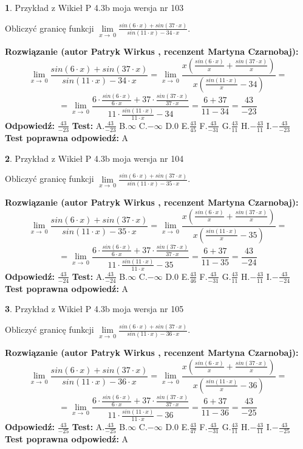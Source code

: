 \documentclass[12pt, a4paper]{article}
\theoremstyle{definition} %
\newtheorem{zad}{}
\newcommand{\zadStart}[1]{\begin{zad}#1\newline}
\newcommand{\zadStop}{\end{zad}}
\newcommand{\rozwStart}[2]{\noindent \textbf{Rozwiązanie (autor #1 , recenzent #2): }\newline}
\newcommand{\rozwStop}{\newline}
\newcommand{\odpStart}{\noindent \textbf{Odpowiedź:}\newline}
\newcommand{\odpStop}{\newline}
\newcommand{\testStart}{\noindent \textbf{Test:}\newline}
\newcommand{\testStop}{\newline}
\newcommand{\kluczStart}{\noindent \textbf{Test poprawna odpowiedź:}\newline}
\newcommand{\kluczStop}{\newline}
\begin{document}
\zadStart{Przykład z Wikieł P 4.3b moja wersja nr 103}


Obliczyć granicę funkcji $\lim\limits_{x\to\ 0}\frac{sin(6 \cdot x)+sin(37 \cdot x)}{sin(11 \cdot x)-34 \cdot x}$.
\zadStop
\rozwStart{Patryk Wirkus}{Martyna Czarnobaj}
$$\lim\limits_{x\to\ 0}\frac{sin(6 \cdot x)+sin(37 \cdot x)}{sin(11 \cdot x)-34 \cdot x}=\lim\limits_{x\to\ 0}\frac{x(\frac{sin(6 \cdot x)}{x}+\frac{sin(37 \cdot x)}{x})}{x(\frac{sin(11 \cdot x)}{x}-34)}=$$
$$=\lim\limits_{x\to\ 0}\frac{6 \cdot \frac{sin(6 \cdot x)}{6 \cdot x}+37 \cdot \frac{sin(37 \cdot x)}{37 \cdot x}}{11 \cdot \frac{sin(11 \cdot x)}{11 \cdot x}-34}=\frac{6+37}{11-34} = \frac{43}{-23}$$
\rozwStop
\odpStart
$\frac{43}{-23}$
\odpStop
\testStart
A.$\frac{43}{-23}$
B.$\infty$
C.$-\infty$
D.$0$
E.$\frac{43}{45}$
F.$\frac{43}{-31}$
G.$\frac{43}{11}$
H.$-\frac{43}{11}$
I.$-\frac{43}{-23}$
\testStop
\kluczStart
A
\kluczStop



\zadStart{Przykład z Wikieł P 4.3b moja wersja nr 104}


Obliczyć granicę funkcji $\lim\limits_{x\to\ 0}\frac{sin(6 \cdot x)+sin(37 \cdot x)}{sin(11 \cdot x)-35 \cdot x}$.
\zadStop
\rozwStart{Patryk Wirkus}{Martyna Czarnobaj}
$$\lim\limits_{x\to\ 0}\frac{sin(6 \cdot x)+sin(37 \cdot x)}{sin(11 \cdot x)-35 \cdot x}=\lim\limits_{x\to\ 0}\frac{x(\frac{sin(6 \cdot x)}{x}+\frac{sin(37 \cdot x)}{x})}{x(\frac{sin(11 \cdot x)}{x}-35)}=$$
$$=\lim\limits_{x\to\ 0}\frac{6 \cdot \frac{sin(6 \cdot x)}{6 \cdot x}+37 \cdot \frac{sin(37 \cdot x)}{37 \cdot x}}{11 \cdot \frac{sin(11 \cdot x)}{11 \cdot x}-35}=\frac{6+37}{11-35} = \frac{43}{-24}$$
\rozwStop
\odpStart
$\frac{43}{-24}$
\odpStop
\testStart
A.$\frac{43}{-24}$
B.$\infty$
C.$-\infty$
D.$0$
E.$\frac{43}{46}$
F.$\frac{43}{-31}$
G.$\frac{43}{11}$
H.$-\frac{43}{11}$
I.$-\frac{43}{-24}$
\testStop
\kluczStart
A
\kluczStop



\zadStart{Przykład z Wikieł P 4.3b moja wersja nr 105}


Obliczyć granicę funkcji $\lim\limits_{x\to\ 0}\frac{sin(6 \cdot x)+sin(37 \cdot x)}{sin(11 \cdot x)-36 \cdot x}$.
\zadStop
\rozwStart{Patryk Wirkus}{Martyna Czarnobaj}
$$\lim\limits_{x\to\ 0}\frac{sin(6 \cdot x)+sin(37 \cdot x)}{sin(11 \cdot x)-36 \cdot x}=\lim\limits_{x\to\ 0}\frac{x(\frac{sin(6 \cdot x)}{x}+\frac{sin(37 \cdot x)}{x})}{x(\frac{sin(11 \cdot x)}{x}-36)}=$$
$$=\lim\limits_{x\to\ 0}\frac{6 \cdot \frac{sin(6 \cdot x)}{6 \cdot x}+37 \cdot \frac{sin(37 \cdot x)}{37 \cdot x}}{11 \cdot \frac{sin(11 \cdot x)}{11 \cdot x}-36}=\frac{6+37}{11-36} = \frac{43}{-25}$$
\rozwStop
\odpStart
$\frac{43}{-25}$
\odpStop
\testStart
A.$\frac{43}{-25}$
B.$\infty$
C.$-\infty$
D.$0$
E.$\frac{43}{47}$
F.$\frac{43}{-31}$
G.$\frac{43}{11}$
H.$-\frac{43}{11}$
I.$-\frac{43}{-25}$
\testStop
\kluczStart
A
\kluczStop
\end{document}
